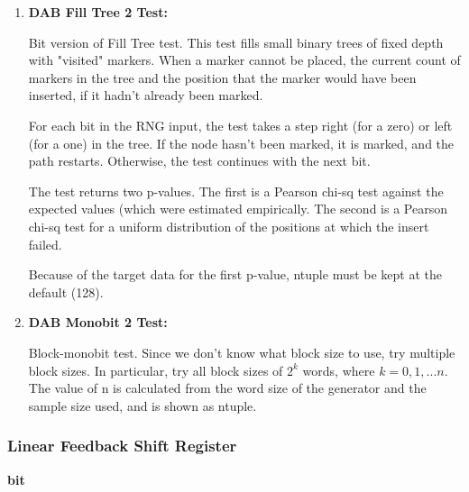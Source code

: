 \documentclass[titlepage, 11pt]{article}
\begin{document}
\begin{enumerate}
\item \textbf{DAB Fill Tree 2 Test:} 

Bit version of Fill Tree test.
This test fills small binary trees of fixed depth with
"visited" markers.  When a marker cannot be placed, the
current count of markers in the tree and the position
that the marker would have been inserted, if it hadn't
already been marked.


For each bit in the RNG input, the test takes a step
right (for a zero) or left (for a one) in the tree.
If the node hasn't been marked, it is marked, and the
path restarts.  Otherwise, the test continues with the
next bit.


The test returns two p-values.  The first is a Pearson
chi-sq test against the expected values (which were
estimated empirically.  The second is a Pearson chi-sq
test for a uniform distribution of the positions at
which the insert failed.


Because of the target data for the first p-value,
ntuple must be kept at the default (128).


\item \textbf{DAB Monobit 2 Test:} 


Block-monobit test.
Since we don't know what block size to use, try multiple block
sizes.  In particular, try all block sizes of $2^k$ words, where
$k={0, 1, ...n}$.  The value of n is calculated from the word size of the
generator and the sample size used, and is shown as ntuple.

\end{enumerate}

\newpage
\subsubsection{Linear Feedback Shift Register}
\textbf{ bit}
\end{document}
